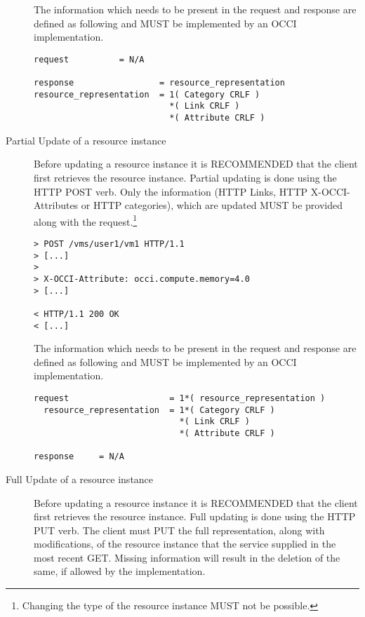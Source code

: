 \documentclass[10pt,a4paper]{article}
\begin{document}
\begin{description}
    The information which needs to be present in the request and
    response are defined as following and MUST be implemented by an
    OCCI implementation.

\begin{verbatim}
request          = N/A

response                 = resource_representation
resource_representation  = 1( Category CRLF )
                           *( Link CRLF )
                           *( Attribute CRLF )
\end{verbatim}

  \item[Partial Update of a resource instance] Before updating a
    resource instance it is RECOMMENDED that the client first
    retrieves the resource instance. Partial updating is done using the HTTP
    POST verb. Only the information (HTTP Links, HTTP
    X-OCCI-Attributes or HTTP categories), which are updated MUST be
    provided along with the request.\footnote{Changing the type of the
      resource instance MUST not be possible.}

\begin{verbatim}
> POST /vms/user1/vm1 HTTP/1.1
> [...]
> 
> X-OCCI-Attribute: occi.compute.memory=4.0
> [...]
 
< HTTP/1.1 200 OK
< [...]
\end{verbatim}

    The information which needs to be present in the request and
    response are defined as following and MUST be implemented by an
    OCCI implementation.

\begin{verbatim}
request                    = 1*( resource_representation )
  resource_representation  = 1*( Category CRLF )
                             *( Link CRLF )
                             *( Attribute CRLF )

response     = N/A
\end{verbatim}

  \item[Full Update of a resource instance] Before updating a resource
    instance it is RECOMMENDED that the client first retrieves the
    resource instance. Full updating is done using the HTTP PUT verb. The
    client must PUT the full representation, along with modifications,
    of the resource instance that the service supplied in the most
    recent GET. Missing information will result in the deletion of the
    same, if allowed by the implementation.
    


\end{description}
\end{document}
